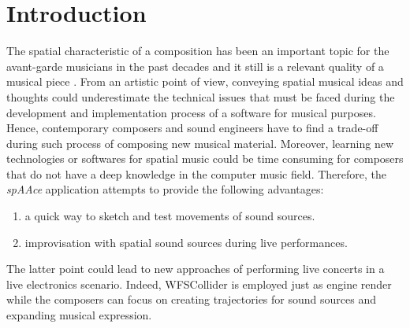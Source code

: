 \documentclass[journal]{IEEEtran}
\begin{document}
\section{Introduction}
The spatial characteristic of a composition has been an important topic for the avant-garde musicians in the past decades \cite{MusikImRaum} and it still is a relevant quality of a musical piece \cite{baalman2003application}. From an artistic point of view, conveying spatial musical ideas and thoughts could underestimate the technical issues that must be faced during the development and implementation process of a software for musical purposes. Hence, contemporary composers and sound engineers have to find a trade-off during such process of composing new musical material. Moreover, learning new technologies or softwares for spatial music could be time consuming for composers that do not have a deep knowledge in the computer music field. Therefore, the \emph{spAAce} application attempts to provide the following advantages:
\begin{enumerate}
\item a quick way to sketch and test movements of sound sources.
\item improvisation with spatial sound sources during live performances.
\end{enumerate}
The latter point could lead to new approaches of performing live concerts in a live electronics scenario. Indeed, WFSCollider is employed just as engine render while the composers can focus on creating trajectories for sound sources and expanding musical expression.
\end{document}
